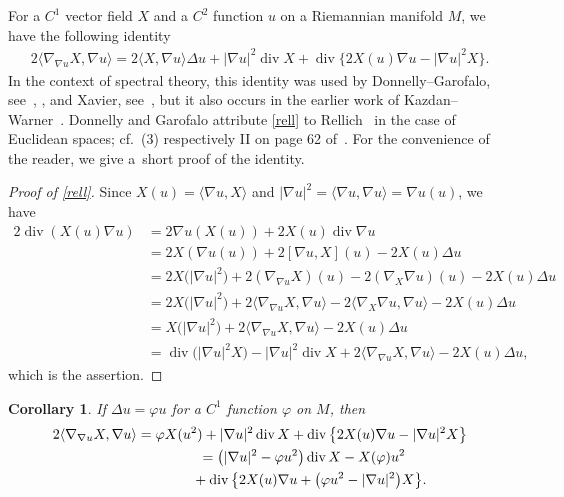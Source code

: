 \documentclass[11pt]{article}
\numberwithin{equation}{section}
\numberwithin{equation}{section}
\newtheorem{Corollary}[Theorem]{Corollary}
\DeclareMathOperator{\diver}{div}
\begin{document}
For a $C^1$ vector field $X$ and a $C^2$ function $u$ on a Riemannian manifold $M$, we have the following identity
\begin{align}
 2\langle\nabla_{\nabla u}X,\nabla u\rangle
 = 2\langle X,\nabla u\rangle\Delta u + |\nabla u|^2\diver X + \diver\big\{2X(u)\nabla u-|\nabla u|^2X\big\}. \label{rell}
\end{align}
In the context of spectral theory, this identity was used by Donnelly--Garofalo,
see~\cite[Lemma~2.1]{DoGa92}, \cite[Proposition 3.1]{DoGa97}, and Xavier, see~\cite[identity~(1)]{Xavier1988},
but it also occurs in the earlier work of Kazdan--Warner~\cite[identity~(8.1)]{KazdanWarner74c}.
Donnelly and Garofalo attribute \eqref{rell} to Rellich~\cite{Rellich43} in the case of Euclidean spaces;
cf.~(3) respectively II on page 62 of~\cite{Rellich43}.
For the convenience of the reader, we give a~short proof of the identity.

\begin{proof}[Proof of \eqref{rell}]
Since $X(u)=\langle\nabla u, X\rangle$ and $|\nabla u|^2=\langle\nabla u,\nabla u\rangle=\nabla u(u)$, we have
\begin{align*}
 2\diver(X(u)\nabla u)
 &= 2\nabla u(X(u)) + 2X(u)\diver\nabla u \\
 &= 2X(\nabla u(u)) + 2[\nabla u,X](u) - 2X(u)\Delta u \\
 &= 2X\bigl(|\nabla u|^2\bigr) + 2(\nabla_{\nabla u}X)(u) - 2(\nabla_X\nabla u)(u) - 2X(u)\Delta u \\
 &= 2X\bigl(|\nabla u|^2\bigr) + 2\langle\nabla_{\nabla u}X,\nabla u\rangle - 2\langle\nabla_X\nabla u,\nabla u\rangle - 2X(u)\Delta u \\
 &= X\bigl(|\nabla u|^2\bigr) + 2\langle\nabla_{\nabla u}X,\nabla u\rangle - 2X(u)\Delta u \\
 &= \diver\bigl(|\nabla u|^2X\bigr) - |\nabla u|^2\diver X + 2\langle\nabla_{\nabla u}X,\nabla u\rangle - 2X(u)\Delta u,
\end{align*}
which is the assertion.
\end{proof}

\begin{Corollary}%
If $\Delta u=\varphi u$ for a $C^1$ function $\varphi$ on $M$, then
\begin{gather}
 2\langle\nabla_{\nabla u}X,\nabla u\rangle
= \varphi X(u^2) + |\nabla u|^2\diver X + \diver\big\{2X(u)\nabla u-|\nabla u|^2X\big\} \label{doga2} \\
\hphantom{2\langle\nabla_{\nabla u}X,\nabla u\rangle}{}= \bigl(|\nabla u|^2 - \varphi u^2\bigr)\diver X - X(\varphi)u^2 \notag\\
 \hphantom{2\langle\nabla_{\nabla u}X,\nabla u\rangle=}{}+ \diver\big\{2X(u)\nabla u+\bigl(\varphi u^2-|\nabla u|^2\bigr)X\big\}. \label{doga3}
\end{gather}
\end{Corollary}
\end{document}
